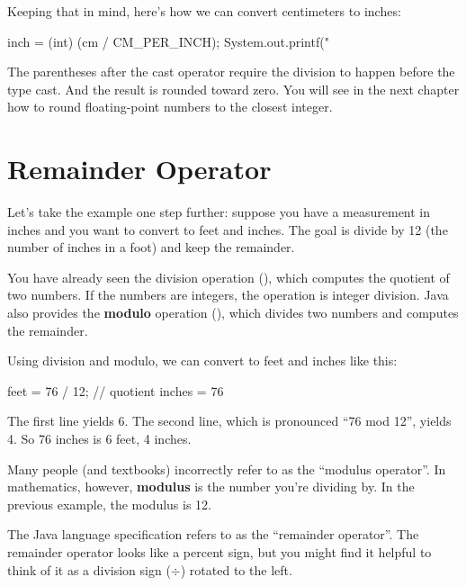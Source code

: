Keeping that in mind, here's how we can convert centimeters to inches:

\begin{code}
inch = (int) (cm / CM_PER_INCH);
System.out.printf("%
\end{code}

The parentheses after the cast operator require the division to happen before the type cast.
And the result is rounded toward zero.
You will see in the next chapter how to round floating-point numbers to the closest integer.


\section{Remainder Operator}

Let's take the example one step further: suppose you have a measurement in inches and you want to convert to feet and inches.
The goal is divide by 12 (the number of inches in a foot) and keep the remainder.


You have already seen the division operation (\java{/}), which computes the quotient of two numbers.
If the numbers are integers, the operation is integer division.
Java also provides the {\bf modulo} operation (\java{\%}), which divides two numbers and computes the remainder.

Using division and modulo, we can convert to feet and inches like this:

\begin{code}
feet = 76 / 12;    // quotient
inches = 76 %
\end{code}

The first line yields 6.
The second line, which is pronounced ``76 mod 12'', yields 4.
So 76 inches is 6 feet, 4 inches.


Many people (and textbooks) incorrectly refer to \java{\%} as the ``modulus operator''.
In mathematics, however, {\bf modulus} is the number you're dividing by.
In the previous example, the modulus is 12.

The Java language specification refers to  \java{\%} as the ``remainder operator''.
The remainder operator looks like a percent sign, but you might find it helpful to think of it as a division sign ($\div$) rotated to the left.



